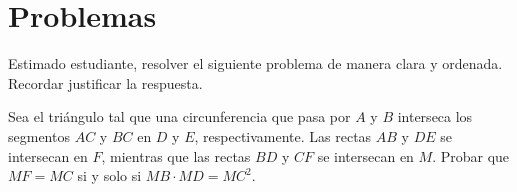 \section{\large Problemas}

Estimado estudiante, resolver el siguiente problema de manera clara y ordenada.
Recordar justificar la respuesta.

\begin{section-problem.tcb}
    Sea el triángulo  tal que una circunferencia que pasa por $A$ y $B$ interseca los segmentos $AC$ y $BC$ en $D$ y $E$, respectivamente.
    Las rectas $AB$ y $DE$ se intersecan en $F$, mientras que las rectas $BD$ y $CF$ se intersecan en $M$.
    Probar que $MF = MC$ si y solo si $MB \cdot MD = MC^2$.
\end{section-problem.tcb}


%